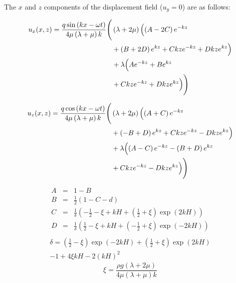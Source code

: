 \noindent The $x$ and $z$ components of the displacement field ($u_y = 0$) are as follows:

\begin{equation}
  \begin{split}
    u_x(x, z) = \frac{q \sin \left(kx - \omega t \right)}{4 \mu \left(\lambda + \mu\right) k}
    \Biggl(& \left( \lambda + 2 \mu \right) \Bigl( \left(A - 2C\right) e^{-kz} \\
    & + \left( B + 2D \right) e^{kz} + Ckz e^{-kz} + Dkz e^{kz}  \Bigr) \\
    & + \lambda \Bigl( A e^{-kz} + B e^{kz} \\
    & + Ckz e^{-kz} + Dkz e^{kz} \Bigr) \Biggr)
  \end{split}
\end{equation}

\begin{equation}
  \begin{split}
    u_z(x, z) = \frac{q \cos \left(kx - \omega t \right)}{4 \mu \left(\lambda + \mu\right) k}
    \Biggl(& \left( \lambda + 2 \mu \right) \Bigl( \left(A + C\right) e^{-kz} \\
    & + \left( -B + D \right) e^{kz} + Ckz e^{-kz} -Dkz e^{kz} \Bigr) \\
    & + \lambda \Bigl( \left( A - C\right) e^{-kz} - \left( B+D \right) e^{kz} \\
    & + Ckz e^{-kz} - Dkz e^{kz} \Bigr) \Biggr)
  \end{split}
\end{equation}


\begin{eqnarray}
  A &=& 1 - B \\
  B &=& \frac{1}{2} \left( 1 - C - d \right) \\
  C &=& \frac{1}{\delta} \left( -\frac{1}{2} - \xi + kH + \left( \frac{1}{2} + \xi \right) \exp \left(2kH\right) \right) \\
  D &=& \frac{1}{\delta} \left( \frac{1}{2} - \xi + kH + \left( -\frac{1}{2} + \xi \right) \exp \left(-2kH\right) \right) \\
\end{eqnarray}
\begin{equation}
  \begin{split}
    \delta = \left( \frac{1}{2} - \xi \right) \exp \left(-2kH\right) + \left(\frac{1}{2} + \xi\right) \exp(2kH) \\
    - 1 + 4 \xi kH - 2\left(kH\right)^2 
  \end{split}
\end{equation}
\begin{equation}
  \xi = \frac{\rho g \left( \lambda + 2 \mu \right)}{4 \mu \left( \lambda + \mu \right) k}
\end{equation}


